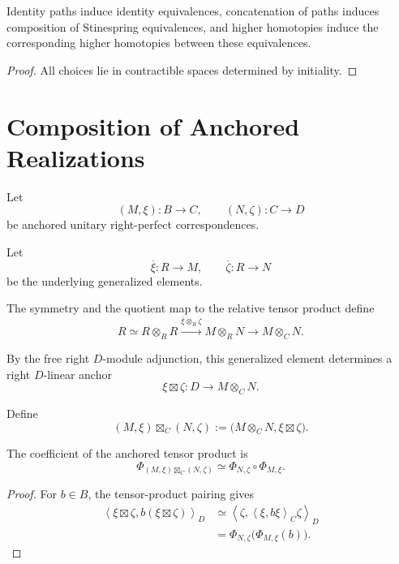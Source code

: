 \begin{corollary}
\label{cor:higher-stinespring-higher-coherence}
Identity paths induce identity equivalences, concatenation of paths induces
composition of Stinespring equivalences, and higher homotopies induce the
corresponding higher homotopies between these equivalences.
\end{corollary}

\begin{proof}
All choices lie in contractible spaces determined by initiality.
\end{proof}

\section{Composition of Anchored Realizations}
\label{sec:higher-stinespring-composition}

Let
\[
  (M,\xi):B\to C,
  \qquad
  (N,\zeta):C\to D
\]
be anchored unitary right-perfect correspondences.

Let
\[
  \overline\xi:R\to M,
  \qquad
  \overline\zeta:R\to N
\]
be the underlying generalized elements.

The symmetry and the quotient map to the relative tensor product define
\[
  R
  \simeq
  R\otimes_RR
  \xrightarrow{\overline\xi\otimes_R\overline\zeta}
  M\otimes_RN
  \longrightarrow
  M\otimes_CN.
\]

By the free right \(D\)-module adjunction, this generalized element determines
a right \(D\)-linear anchor
\[
  \xi\boxtimes\zeta:
  D\to M\otimes_CN.
\]

\begin{definition}
\label{def:higher-anchored-tensor-product}
Define
\[
  (M,\xi)\boxtimes_C(N,\zeta)
  :=
  \bigl(
    M\otimes_CN,
    \xi\boxtimes\zeta
  \bigr).
\]
\end{definition}

\begin{proposition}
\label{prop:higher-coefficient-composition}
The coefficient of the anchored tensor product is
\[
  \Phi_{(M,\xi)\boxtimes_C(N,\zeta)}
  \simeq
  \Phi_{N,\zeta}
  \circ
  \Phi_{M,\xi}.
\]
\end{proposition}

\begin{proof}
For \(b\in B\), the tensor-product pairing gives
\[
\begin{aligned}
  \left\langle
    \xi\boxtimes\zeta,
    b(\xi\boxtimes\zeta)
  \right\rangle_D
  &\simeq
  \left\langle
    \zeta,
    \left\langle
      \xi,
      b\xi
    \right\rangle_C
    \zeta
  \right\rangle_D
  \\
  &=
  \Phi_{N,\zeta}
  \bigl(
    \Phi_{M,\xi}(b)
  \bigr).
\end{aligned}
\]
\end{proof}

